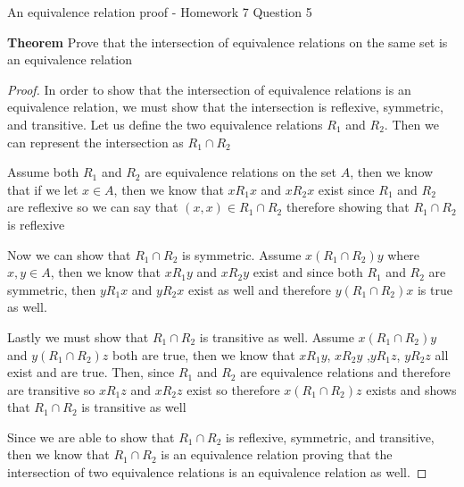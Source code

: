 An equivalence relation proof - Homework 7 Question 5

\textbf{Theorem}
Prove that the intersection of equivalence relations on the same set is an equivalence relation

\begin{proof}
In order to show that the intersection of equivalence relations is an equivalence relation, we must show that the intersection is reflexive, symmetric, and transitive. Let us define the two equivalence relations $R_1$ and $R_2$. Then we can represent the intersection as $R_1\cap R_2$

 Assume both $R_1$ and $R_2$ are equivalence relations on the set $A$, then we know that if we let $x\in A$, then we know that $xR_1x$ and $xR_2x$ exist since $R_1$ and $R_2$ are reflexive so we can say that $(x,x)\in R_1\cap R_2$ therefore showing that $R_1\cap R_2$ is reflexive
 
 Now we can show that $R_1\cap R_2$ is symmetric. Assume $x(R_1\cap R_2)y$ where $x,y \in A$, then we know that $xR_1y$ and $xR_2y$ exist and since both $R_1$ and $R_2$ are symmetric, then $yR_1x$ and $yR_2x$ exist as well and therefore $y(R_1\cap R_2)x$ is true as well.
 
 Lastly we must show that $R_1\cap R_2$ is transitive as well. Assume $x(R_1\cap R_2)y$ and $y(R_1\cap R_2)z$ both are true, then we know that $xR_1y$, $xR_2y$ ,$yR_1z$, $yR_2z$ all exist and are true. Then, since $R_1$ and $R_2$ are equivalence relations and therefore are transitive so $xR_1z$ and $xR_2z$ exist so therefore $x(R_1\cap R_2)z$ exists and shows that $R_1\cap R_2$ is transitive as well

Since we are able to show that $R_1\cap R_2$ is reflexive, symmetric, and transitive, then we know that $R_1\cap R_2$ is an equivalence relation proving that the intersection of two equivalence relations is an equivalence relation as well.
\end{proof}